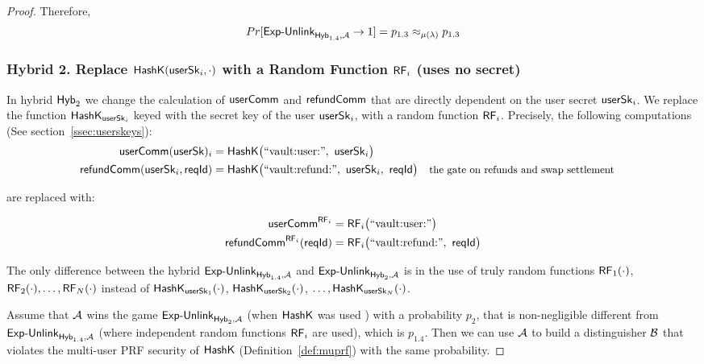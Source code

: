 \begin{proof}
Therefore, $$Pr[\mathsf{Exp\text{-}Unlink}_{\mathsf{Hyb}_{1.4},\mathcal{A}}  \rightarrow 1] = p_{1.3}\approx_{\mu(\lambda)} p_{1.3}$$


\subsubsection{Hybrid 2. Replace \texorpdfstring{$\mathsf{HashK}(\mathsf{userSk}_i, \cdot)$}{HashK(userSk\_i, .)} with a Random Function \texorpdfstring{$\mathsf{RF}_i$}{RF\_i} (uses no secret)}
In hybrid $\mathsf{Hyb}_2$ we change the calculation of $\mathsf{userComm}$ and $\mathsf{refundComm}$ that are directly  dependent on the user secret $\mathsf{userSk}_i$.
We replace the function $\mathsf{HashK}_{\mathsf{userSk}_i}$ keyed with the secret key of the user $\mathsf{userSk}_i$, with a random function $\mathsf{RF}_i$. Precisely,  the following computations (See section~\ref{ssec:userskeys}):
\begin{align*}
{\userComm(\usersk)_i} &= \Hash\bigl(\text{``vault:user:''}\bc \usersk_i\bigr)
\\
{\refundComm(\usersk_i, \rid)} &= \Hash\bigl(\text{``vault:refund:''}\bc \usersk_i\bc \rid\bigr)
  &&\text{\small the gate on refunds and swap settlement}
\end{align*}

are replaced with:


\begin{align*}
 {\userComm^{\RandFun_i}} &= \RandFun_i\bigl(\text{``vault:user:''}\bigr)\\
{\refundComm^{\RandFun_i}(\rid)} &= \RandFun_i\bigl(\text{``vault:refund:''}\bc  \rid\bigr)
 \end{align*}


The only difference between the hybrid  $\mathsf{Exp\text{-}Unlink}_{\mathsf{Hyb}_{1.4},\mathcal{A}}$  and $\mathsf{Exp\text{-}Unlink}_{\mathsf{Hyb}_{2},\mathcal{A}}$
is in the use of truly random functions
$\mathsf{RF}_1(\cdot)$, $\mathsf{RF}_2(\cdot), \dots, \mathsf{RF}_{N}(\cdot)$ instead of
$\mathsf{HashK}_{\mathsf{userSk}_1}(\cdot)$, $\mathsf{HashK}_{\mathsf{userSk}_2}(\cdot)$, $\ldots,\mathsf{HashK}_{\mathsf{userSk}_{N}}(\cdot)$.

Assume that $\mathcal{A}$ wins the game $\mathsf{Exp\text{-}Unlink}_{\mathsf{Hyb}_{2},\mathcal{A}}$  (when $\mathsf{HashK}$  was used ) with a probability $p_{2}$,  that is non-negligible different from $\mathsf{Exp\text{-}Unlink}_{\mathsf{Hyb}_{1.4},\mathcal{A}}$ (where independent random functions $\mathsf{RF}_i$ are used), which is $p_{1.4}$.
Then we can use $\mathcal{A}$ to build a  distinguisher $\mathcal{B}$ that violates the multi-user PRF security of $\mathsf{HashK}$  (Definition~\ref{def:muprf}) with  the same probability.


\end{proof}
